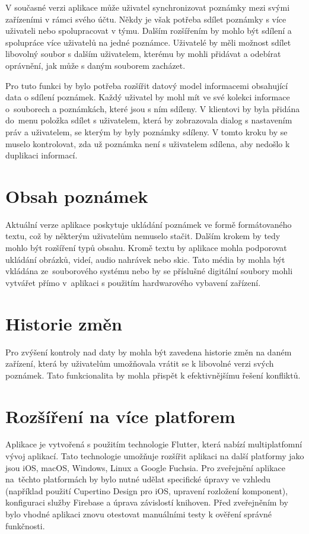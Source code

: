 \documentclass[czech, bc, kiv, he, iso690numb]{fasthesis}
\begin{document}
V současné verzi aplikace může uživatel synchronizovat poznámky mezi svými zařízeními v rámci svého účtu. Někdy je však potřeba sdílet poznámky s více uživateli nebo spolupracovat v týmu. Dalším rozšířením by mohlo být sdílení a spolupráce více uživatelů na jedné poznámce. Uživatelé by měli možnost sdílet libovolný soubor s dalším uživatelem, kterému by mohli přidávat a odebírat oprávnění, jak může s daným souborem zacházet.

Pro tuto funkci by bylo potřeba rozšířit datový model informacemi obsahující data o sdílení poznámek. Každý uživatel by mohl mít ve své kolekci informace o~souborech a poznámkách, které jsou s ním sdíleny. V klientovi by byla přidána do~menu položka sdílet s uživatelem, která by zobrazovala dialog s nastavením práv a uživatelem, se kterým by byly poznámky sdíleny. V tomto kroku by se muselo kontrolovat, zda už poznámka není s uživatelem sdílena, aby nedošlo k duplikaci informací. 

\section{Obsah poznámek}

Aktuální verze aplikace poskytuje ukládání poznámek ve formě formátovaného textu, což by některým uživatelům nemuselo stačit. Dalším krokem by tedy mohlo být rozšíření typů obsahu. Kromě textu by aplikace mohla podporovat ukládání obrázků, videí, audio nahrávek nebo skic. Tato média by mohla být vkládána ze~souborového systému nebo by se příslušné digitální soubory mohli vytvářet přímo v~aplikaci s použitím hardwarového vybavení zařízení.

\section{Historie změn}

Pro zvýšení kontroly nad daty by mohla být zavedena historie změn na daném zařízení, která by uživatelům umožňovala vrátit se k libovolné verzi svých poznámek. Tato funkcionalita by mohla přispět k efektivnějšímu řešení konfliktů.

\section{Rozšíření na více platforem} 

Aplikace je vytvořená s použitím technologie Flutter, která nabízí multiplatfomní vývoj aplikací. Tato technologie umožňuje rozšířit aplikaci na další platformy jako jsou iOS, macOS, Windows, Linux a Google Fuchsia. Pro zveřejnění aplikace na~těchto platformách by bylo nutné udělat specifické úpravy ve vzhledu (například použití Cupertino Design pro iOS, upravení rozložení komponent), konfiguraci služby Firebase a úprava závislostí knihoven. Před zveřejněním by bylo vhodné aplikaci znovu otestovat manuálními testy k ověření správné funkčnosti. 
\end{document}
